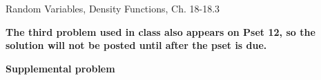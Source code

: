 \documentclass[handout]{mcs}
\begin{document}

\begin{staffnotes}
Random Variables, Density Functions, Ch. 18-18.3
\end{staffnotes}



\begin{center}
\textbf{The third problem used in class also appears on Pset 12, so
  the solution will not be posted until after the pset is due.  }
\end{center}

\iffalse
\pinput{CP_max_ranvar}
\fi




\begin{center}
\textbf{\large Supplemental problem}
\end{center}









\end{document}
